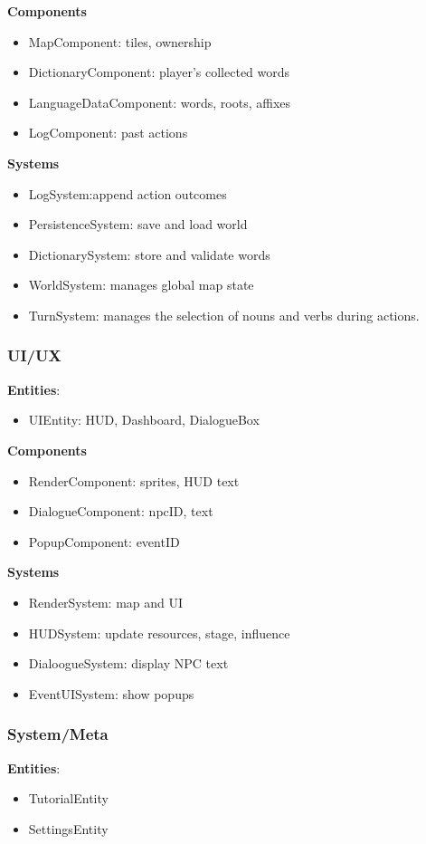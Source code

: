 \documentclass[11pt]{article}
\begin{document}
\textbf{Components}
\begin{itemize}
\item
  MapComponent: tiles, ownership
\item
  DictionaryComponent: player's collected words
\item
  LanguageDataComponent: words, roots, affixes
\item
  LogComponent: past actions
\end{itemize}

\textbf{Systems}
\begin{itemize}
\item
  LogSystem:append action outcomes
\item
  PersistenceSystem: save and load world
\item
  DictionarySystem: store and validate words
\item
  WorldSystem: manages global map state
\item
  TurnSystem: manages the selection of nouns and verbs during actions.
\end{itemize}

\subsubsection{UI/UX}
\textbf{Entities}:
\begin{itemize}
\item
  UIEntity: HUD, Dashboard, DialogueBox
\end{itemize}

\textbf{Components}
\begin{itemize}
\item
  RenderComponent: sprites, HUD text
\item
  DialogueComponent: npcID, text
\item
  PopupComponent: eventID
\end{itemize}

\textbf{Systems}
\begin{itemize}
\item
  RenderSystem: map and UI
\item
  HUDSystem: update resources, stage, influence
\item
  DialoogueSystem: display NPC text
\item
  EventUISystem: show popups
\end{itemize}

\subsubsection{System/Meta}
\textbf{Entities}:
\begin{itemize}
\item
  TutorialEntity
\item
  SettingsEntity
\end{itemize}
\end{document}
